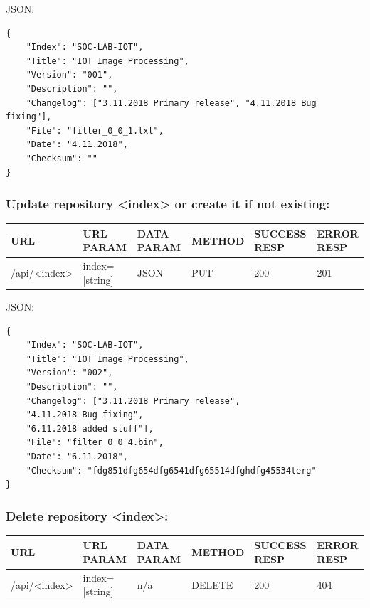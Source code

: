 JSON:
\begin{verbatim}
{
    "Index": "SOC-LAB-IOT",
    "Title": "IOT Image Processing",
    "Version": "001",
    "Description": "",
    "Changelog": ["3.11.2018 Primary release", "4.11.2018 Bug fixing"],
    "File": "filter_0_0_1.txt",
    "Date": "4.11.2018",
    "Checksum": ""
}	    
\end{verbatim}

\subsubsection{Update repository <index> or create it if not existing:}
\begin{table}[h]
    \begin{tabular}[h]{llllll}
    URL          & URL PARAM      & DATA PARAM   & METHOD & SUCCESS RESP & ERROR RESP \\ \hline
    /api/<index> & index=[string] & JSON  & PUT    & 200              & 201            \\ 
    \end{tabular}
\end{table}

JSON:
\begin{verbatim}
{
    "Index": "SOC-LAB-IOT",
    "Title": "IOT Image Processing",
    "Version": "002",
    "Description": "",
    "Changelog": ["3.11.2018 Primary release", 
    "4.11.2018 Bug fixing", 
    "6.11.2018 added stuff"],
    "File": "filter_0_0_4.bin",
    "Date": "6.11.2018",
    "Checksum": "fdg851dfg654dfg6541dfg65514dfghdfg45534terg"
}	
\end{verbatim}

\subsubsection{Delete repository <index>:}

\begin{table}[h]
    \begin{tabular}[h]{llllll}
    URL          & URL PARAM      & DATA PARAM & METHOD & SUCCESS RESP & ERROR RESP \\ \hline
    /api/<index> & index=[string] & n/a        & DELETE & 200              & 404            \\ 
    \end{tabular}
\end{table}

